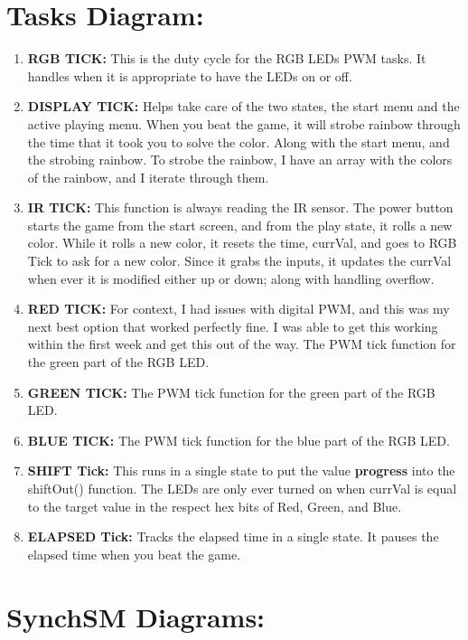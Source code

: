 \documentclass[12pt]{article}
\begin{document}
\section{Tasks Diagram:}
\begin{enumerate}
  \item\textbf{RGB TICK:}
    This is the duty cycle for the RGB LEDs PWM tasks.
    It handles when it is appropriate to have the LEDs on or off.
  \item\textbf{DISPLAY TICK:}
    Helps take care of the two states, the start menu and the active playing menu.
    When you beat the game, it will strobe rainbow through the time that it took you to solve the color.
    Along with the start menu, and the strobing rainbow. 
    To strobe the rainbow, I have an array with the colors of the rainbow,
    and I iterate through them.
  \item\textbf{IR TICK:}
    This function is always reading the IR sensor. 
    The power button starts the game from the start screen, and from the play state, it rolls a new color.
    While it rolls a new color, it resets the time, currVal, and goes to RGB Tick to ask for a new color. 
    Since it grabs the inputs, it updates the currVal when ever it is modified either up or down;
    along with handling overflow.
  \item\textbf{RED TICK:}
    For context, I had issues with digital PWM, and this was my next best option that worked perfectly fine. 
    I was able to get this working within the first week and get this out of the way.
    The PWM tick function for the green part of the RGB LED.
  \item\textbf{GREEN TICK:}
    The PWM tick function for the green part of the RGB LED.
  \item\textbf{BLUE TICK:}
    The PWM tick function for the blue part of the RGB LED.
  \item\textbf{SHIFT Tick:}
    This runs in a single state to put the value \textbf{progress} into 
    the shiftOut() function. The LEDs are only ever turned on when 
    currVal is equal to the target value in the respect hex bits of Red, Green, and Blue.
  \item\textbf{ELAPSED Tick:}
    Tracks the elapsed time in a single state.
    It pauses the elapsed time when you beat the game. 
\end{enumerate}

\section{SynchSM Diagrams:}
 
 
\end{document}
